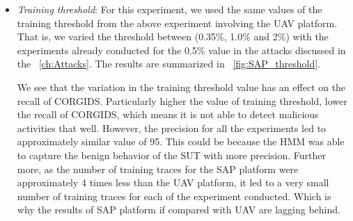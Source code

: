 \begin{itemize}
\item \textit{Training threshold}: For this experiment, we used the same values of the training threshold from the above experiment involving the \ac{UAV} platform. That is, we varied the threshold between (0.35\%, 1.0\% and 2\%) with the experiments already conducted for the 0.5\% value in the attacks discussed in the ~\autoref{ch:Attacks}. The results are summarized in ~\autoref{fig:SAP_threshold}.

We see that the variation in the training threshold value has an effect on the recall of \ac{CORGIDS}. Particularly higher the value of training threshold, lower the recall of \ac{CORGIDS}, which means it is not able to detect malicious activities that well. However, the precision for all the experiments led to approximately similar value of 95. This could be because the HMM was able to capture the benign behavior of the \ac{SUT} with more precision. Further more, as the number of training traces for the \ac{SAP} platform were approximately 4 times less than the \ac{UAV} platform, it led to a very small number of training traces for each of the experiment conducted. Which is why the results of \ac{SAP} platform if compared with \ac{UAV} are lagging behind.

\end{itemize}
